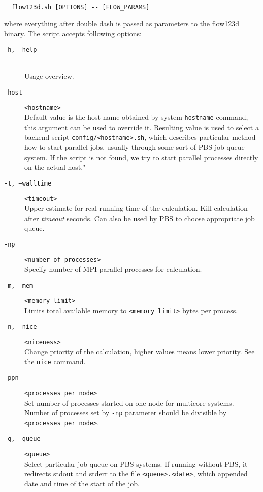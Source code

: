 \documentclass[12pt,a4paper]{report}
\begin{document}
\begin{verbatim}
  flow123d.sh [OPTIONS] -- [FLOW_PARAMS]
\end{verbatim}
where everything after double dash is passed as parameters to the flow123d binary. The script accepts following options:

\begin{description}
  \item[{\tt -h, --help}] \hfill\\
  	Usage overview.
  \item[{\tt --host}] \verb'<hostname>' \hfill\\
        Default value is the host name obtained by system \verb'hostname' command, this argument can be used to override it. 
        Resulting value is used to select a backend script \verb'config/<hostname>.sh', which describes particular method how to start 
        parallel jobs, usually through some sort of PBS job queue system. If the script is not found, we try to start parallel processes 
        directly on the actual host."
  \item[{\tt -t, --walltime}] \verb'<timeout>' \hfill\\
  	Upper estimate for real running time of the calculation. Kill calculation after {\it timeout} seconds. 
  	Can also be used by PBS to choose appropriate job queue. 
  \item[{\tt -np}] \verb'<number of processes>' \hfill\\
  	Specify number of MPI parallel processes for calculation.
  \item[{\tt -m, --mem}] \verb'<memory limit>' \hfill\\
  	Limits total available memory to \verb'<memory limit>' bytes per process.
  \item[{\tt -n, --nice}] \verb'<niceness>' \hfill\\
  	Change priority of the calculation, higher values means lower priority. See the {\tt nice} command.
  \item[{\tt -ppn}] \verb'<processes per node>' \hfill\\
       Set number of processes started on one node for multicore systems. 
       Number of processes set by \verb'-np' parameter should be divisible by \verb'<processes per node>'.
  \item[{\tt -q, --queue}] \verb'<queue>' \hfill\\
       Select particular job queue on PBS systems. If running without PBS, 
       it redirects stdout and stderr to the file \verb'<queue>.<date>', which appended date and time of the start of the job.
\end{description}
\end{document}
